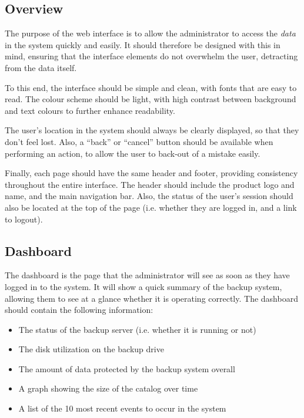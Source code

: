 \subsection{Overview}

The purpose of the web interface is to allow the administrator to access the
\emph{data} in the system quickly and easily. It should therefore be designed
with this in mind, ensuring that the interface elements do not overwhelm the
user, detracting from the data itself.

To this end, the interface should be simple and clean, with fonts that are easy
to read. The colour scheme should be light, with high contrast between
background and text colours to further enhance readability.

The user's location in the system should always be clearly displayed, so that
they don't feel lost. Also, a ``back'' or ``cancel'' button should be available
when performing an action, to allow the user to back-out of a mistake easily.

Finally, each page should have the same header and footer, providing
consistency throughout the entire interface. The header should include the
product logo and name, and the main navigation bar. Also, the status of the
user's session should also be located at the top of the page (i.e. whether they
are logged in, and a link to logout).

\subsection{Dashboard}

The dashboard is the page that the administrator will see as soon as they have
logged in to the system. It will show a quick summary of the backup system,
allowing them to see at a glance whether it is operating correctly. The
dashboard should contain the following information:

\begin{itemize}
    \item The status of the backup server (i.e. whether it is running or not)
    \item The disk utilization on the backup drive
    \item The amount of data protected by the backup system overall
    \item A graph showing the size of the catalog over time
    \item A list of the 10 most recent events to occur in the system
\end{itemize}

